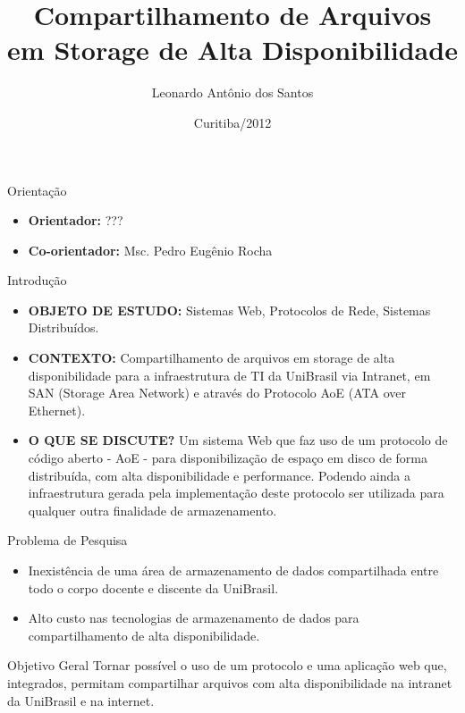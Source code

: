 \documentclass{beamer}
\title[Compart. Arquiv. em Storage de Alta Disponibilidade]{Compartilhamento de Arquivos\\ em Storage de Alta Disponibilidade}
\author{Leonardo Antônio dos Santos}
\institute{Faculdades Integradas do Brasil - UniBrasil}
\date{Curitiba/2012}
\begin{document}
\begin{frame}
\titlepage
\end{frame}


\begin{frame}{Orientação}
\begin{itemize}
\item \textbf{Orientador:} ???
\item \textbf{Co-orientador:} Msc. Pedro Eugênio Rocha
\end{itemize}
\end{frame}


\begin{frame}{Introdução}
\begin{itemize}
\item \textbf{OBJETO DE ESTUDO:} Sistemas Web, Protocolos de Rede, Sistemas Distribuídos.  	\\
\item \textbf{CONTEXTO:} Compartilhamento de arquivos em storage de alta disponibilidade para a infraestrutura de TI da UniBrasil via Intranet, em SAN (Storage Area Network) e através do Protocolo AoE (ATA over Ethernet). \\
\item \textbf{O QUE SE DISCUTE?} Um sistema Web que faz uso de um protocolo de código aberto - AoE - para disponibilização de espaço em disco de forma distribuída, com alta disponibilidade e performance. Podendo ainda a infraestrutura gerada pela implementação deste protocolo ser utilizada para qualquer outra finalidade de armazenamento. 
\end{itemize}
\end{frame}


\begin{frame}{Problema de Pesquisa}
\begin{itemize}[<+->]
\item Inexistência de uma área de armazenamento de dados compartilhada entre todo o corpo docente e discente da UniBrasil.
\item Alto custo nas tecnologias de armazenamento de dados para compartilhamento de alta disponibilidade.
\end{itemize}
\end{frame}


\begin{frame}{Objetivo Geral}
Tornar possível o uso de um protocolo e uma aplicação web que, integrados, permitam compartilhar arquivos com alta disponibilidade na intranet da UniBrasil e na internet.
\end{frame}
\end{document}
